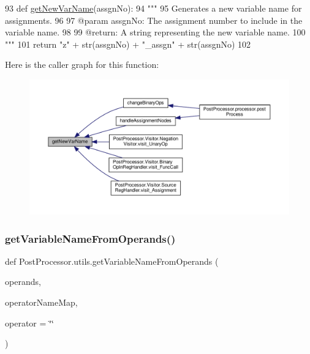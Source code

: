 \begin{DoxyCode}
93 \textcolor{keyword}{def }\hyperlink{namespacePostProcessor_1_1utils_a69c4094b747eccefbd43b8011b1c3626}{getNewVarName}(assgnNo):
94     \textcolor{stringliteral}{"""
}
95 \textcolor{stringliteral}{    Generates a new variable name for assignments.
}
96 \textcolor{stringliteral}{
}
97 \textcolor{stringliteral}{    @param assgnNo: The assignment number to include in the variable name.
}
98 \textcolor{stringliteral}{
}
99 \textcolor{stringliteral}{    @return: A string representing the new variable name.
}
100 \textcolor{stringliteral}{    """}
101     \textcolor{keywordflow}{return} \textcolor{stringliteral}{"z"} + str(assgnNo) + \textcolor{stringliteral}{"\_assgn"} + str(assgnNo)
102 
\end{DoxyCode}
Here is the caller graph for this function\+:\nopagebreak
\begin{figure}[H]
\begin{center}
\leavevmode
\includegraphics[width=350pt]{namespacePostProcessor_1_1utils_a69c4094b747eccefbd43b8011b1c3626_icgraph}
\end{center}
\end{figure}
\mbox{\label{namespacePostProcessor_1_1utils_a9d9413cee00e1440bd03c215f3ebbaff}} 
\subsubsection{\texorpdfstring{get\+Variable\+Name\+From\+Operands()}{getVariableNameFromOperands()}}
{\footnotesize\ttfamily def Post\+Processor.\+utils.\+get\+Variable\+Name\+From\+Operands (\begin{DoxyParamCaption}\item[{}]{operands,  }\item[{}]{operator\+Name\+Map,  }\item[{}]{operator = {\ttfamily \char`\"{}\char`\"{}} }\end{DoxyParamCaption})}

